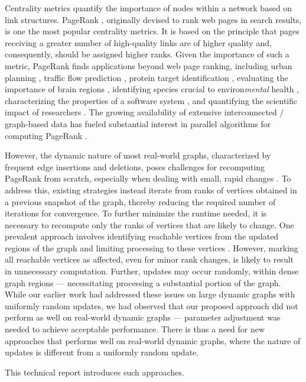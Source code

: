 Centrality metrics quantify the importance of nodes within a network based on link structures. PageRank \cite{rank-page99}, originally devised to rank web pages in search results, is one the most popular centrality metrics. It is based on the principle that pages receiving a greater number of high-quality links are of higher quality and, consequently, should be assigned higher ranks. Given the importance of such a metric, PageRank finds applications beyond web page ranking, including urban planning \cite{urban-zhang18}, traffic flow prediction \cite{traffic-kim15}, protein target identification \cite{banky2013equal}, evaluating the importance of brain regions \cite{zuo2012network}, identifying species crucial to environ\textit{mental} health \cite{allesina2009googling}, characterizing the properties of a software system \cite{chepelianskii2010towards}, and quantifying the scientific impact of researchers \cite{rank-senanayake15}. The growing availability of extensive interconnected / graph-based data has fueled substantial interest in parallel algorithms for computing PageRank \cite{rank-garg16, rank-nvgraph, rank-giri20, rank-guoqiang20, rank-li21, rank-sadi18, rank-sarma13}.

However, the dynamic nature of most real-world graphs, characterized by frequent edge insertions and deletions, poses challenges for recomputing PageRank from scratch, especially when dealing with small, rapid changes \cite{agarwal2012real, barros2021survey}. To address this, existing strategies instead iterate from ranks of vertices obtained in a previous snapshot of the graph, thereby reducing the required number of iterations for convergence. To further minimize the runtime needed, it is necessary to recompute only the ranks of vertices that are likely to change. One prevalent approach involves identifying reachable vertices from the updated regions of the graph and limiting processing to these vertices \cite{rank-desikan05, kim2015incremental, rank-giri20, sahu2022dynamic}. However, marking all reachable vertices as affected, even for minor rank changes, is likely to result in unnecessary computation. Further, updates may occur randomly, within dense graph regions --- necessitating processing a substantial portion of the graph. While our earlier work \cite{sahu2024incrementally} had addressed these issues on large dynamic graphs with uniformly random updates, we had observed that our proposed approach did not perform as well on real-world dynamic graphs --- parameter adjustment was needed to achieve acceptable performance. There is thus a need for new approaches that performs well on real-world dynamic graphs, where the nature of updates is different from a uniformly random update. This technical report introduces such approaches.

